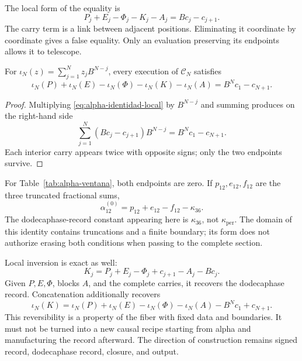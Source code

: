 The local form of the equality is
\begin{equation}
 P_j+E_j-\Phi_j-K_j-A_j=Bc_j-c_{j+1}.
 \label{eq:alpha-identidad-local}
\end{equation}
The carry term is a link between adjacent positions. Eliminating it
coordinate by coordinate gives a false equality. Only an
evaluation preserving its endpoints allows it to telescope.

\begin{proposition}
\label{prop:alpha-telescopia}
For \(\iota_N(z)=\sum_{j=1}^{N}z_jB^{N-j}\), every execution of
\(\mathcal C_N\) satisfies
\begin{equation}
 \iota_N(P)+\iota_N(E)-\iota_N(\Phi)-\iota_N(K)-\iota_N(A)
 =B^Nc_1-c_{N+1}.
 \label{eq:alpha-telescopia}
\end{equation}
\end{proposition}

\begin{proof}
Multiplying \eqref{eq:alpha-identidad-local} by \(B^{N-j}\) and summing
produces on the right-hand side
\[
 \sum_{j=1}^{N}(Bc_j-c_{j+1})B^{N-j}=B^Nc_1-c_{N+1}.
\]
Each interior carry appears twice with opposite signs; only
the two endpoints survive.
\end{proof}

For Table~\ref{tab:alpha-ventana}, both endpoints are zero. If
\(p_{12},e_{12},f_{12}\) are the three truncated fractional sums,
\[
 \alpha_{12}^{(0)}=p_{12}+e_{12}-f_{12}-\kappa_{36}.
\]
The dodecaphase-record constant appearing here is \(\kappa_{36}\), not
\(\kappa_{\mathrm{per}}\). The domain of this identity contains
truncations and a finite boundary; its form does not authorize erasing both
conditions when passing to the complete section.

Local inversion is exact as well:
\[
 K_j=P_j+E_j-\Phi_j+c_{j+1}-A_j-Bc_j.
\]
Given \(P,E,\Phi\), blocks \(A\), and the complete carries,
it recovers the dodecaphase record. Concatenation additionally recovers
\[
 \iota_N(K)=\iota_N(P)+\iota_N(E)-\iota_N(\Phi)-\iota_N(A)
             -B^Nc_1+c_{N+1}.
\]
This reversibility is a property of the fiber with fixed data and
boundaries. It must not be turned into a new causal recipe starting from
alpha and manufacturing the record afterward. The direction of construction remains
signed record, dodecaphase record, closure, and output.



